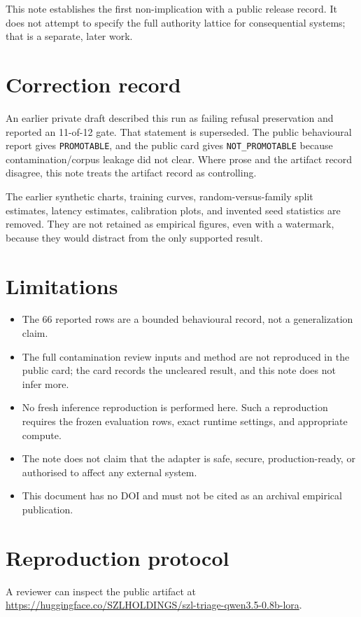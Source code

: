 \documentclass[10pt,letterpaper]{article}
\newcommand{\blocked}{\texttt{NOT\_PROMOTABLE}}
\newcommand{\promotable}{\texttt{PROMOTABLE}}
\begin{document}
This note establishes the first non-implication with a public release record. It does not attempt to specify the full authority lattice for consequential systems; that is a separate, later work.

\section{Correction record}
An earlier private draft described this run as failing refusal preservation and reported an 11-of-12 gate. That statement is superseded. The public behavioural report gives \promotable{}, and the public card gives \blocked{} because contamination/corpus leakage did not clear. Where prose and the artifact record disagree, this note treats the artifact record as controlling.

The earlier synthetic charts, training curves, random-versus-family split estimates, latency estimates, calibration plots, and invented seed statistics are removed. They are not retained as empirical figures, even with a watermark, because they would distract from the only supported result.

\section{Limitations}
\begin{itemize}[leftmargin=1.4em]
\item The 66 reported rows are a bounded behavioural record, not a generalization claim.
\item The full contamination review inputs and method are not reproduced in the public card; the card records the uncleared result, and this note does not infer more.
\item No fresh inference reproduction is performed here. Such a reproduction requires the frozen evaluation rows, exact runtime settings, and appropriate compute.
\item The note does not claim that the adapter is safe, secure, production-ready, or authorised to affect any external system.
\item This document has no DOI and must not be cited as an archival empirical publication.
\end{itemize}

\section{Reproduction protocol}
A reviewer can inspect the public artifact at
\url{https://huggingface.co/SZLHOLDINGS/szl-triage-qwen3.5-0.8b-lora}.
\end{document}
